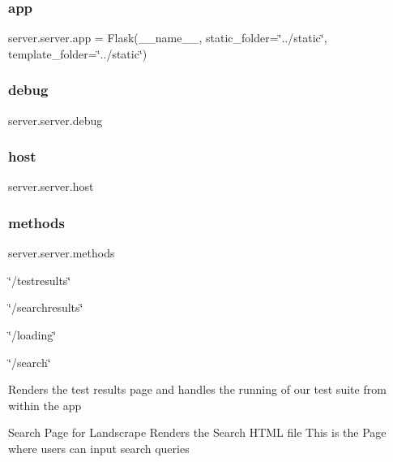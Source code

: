 \subsubsection{\texorpdfstring{app}{app}}
{\footnotesize\ttfamily server.\+server.\+app = Flask(\+\_\+\+\_\+name\+\_\+\+\_\+, static\+\_\+folder=\char`\"{}../static\char`\"{}, template\+\_\+folder=\char`\"{}../static\char`\"{})}

\mbox{\label{namespaceserver_1_1server_addf5a8b97b626d4622f3fb2b2f8065ab}} 
\subsubsection{\texorpdfstring{debug}{debug}}
{\footnotesize\ttfamily server.\+server.\+debug}

\mbox{\label{namespaceserver_1_1server_adca03b39e1ec441d3c574a753afb0016}} 
\subsubsection{\texorpdfstring{host}{host}}
{\footnotesize\ttfamily server.\+server.\+host}

\mbox{\label{namespaceserver_1_1server_a1e0984522028dec04483b66d00e8b6b6}} 
\subsubsection{\texorpdfstring{methods}{methods}}
{\footnotesize\ttfamily server.\+server.\+methods}



\char`\"{}/testresults\char`\"{} 

\char`\"{}/searchresults\char`\"{}

\char`\"{}/loading\char`\"{}

\char`\"{}/search\char`\"{}

Renders the test results page and handles the running of our test suite from within the app

Search Page for Landscrape Renders the Search H\+T\+ML file This is the Page where users can input search queries

